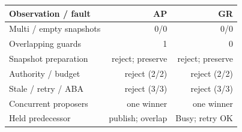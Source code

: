 \begin{tabular}{lrr}
\toprule
Observation / fault & AP & GR \\
\midrule
Multi / empty snapshots & 0/0 & 0/0 \\
Overlapping guards & 1 & 0 \\
\midrule
Snapshot preparation & reject; preserve & reject; preserve \\
Authority / budget & reject (2/2) & reject (2/2) \\
Stale / retry / ABA & reject (3/3) & reject (3/3) \\
Concurrent proposers & one winner & one winner \\
Held predecessor & publish; overlap & Busy; retry OK \\
\bottomrule
\end{tabular}

